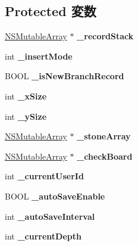 \subsection*{Protected 変数}
\begin{DoxyCompactItemize}
\item 
\hypertarget{interface_games_a7f97e43d2e57ea8b8d24bbebec583013}{
\hyperlink{class_n_s_mutable_array}{NSMutableArray} $\ast$ {\bfseries \_\-recordStack}}
\label{interface_games_a7f97e43d2e57ea8b8d24bbebec583013}

\item 
\hypertarget{interface_games_adf59b1fa9a0cfe911d992ffa2ab00ede}{
int {\bfseries \_\-insertMode}}
\label{interface_games_adf59b1fa9a0cfe911d992ffa2ab00ede}

\item 
\hypertarget{interface_games_af1c274d54923dce41904ba78f1256ac5}{
BOOL {\bfseries \_\-isNewBranchRecord}}
\label{interface_games_af1c274d54923dce41904ba78f1256ac5}

\item 
\hypertarget{interface_games_abb798d37b60e6016079ec2c01335624d}{
int {\bfseries \_\-xSize}}
\label{interface_games_abb798d37b60e6016079ec2c01335624d}

\item 
\hypertarget{interface_games_adbf5d8b47c74df7302f494d2d7e6958f}{
int {\bfseries \_\-ySize}}
\label{interface_games_adbf5d8b47c74df7302f494d2d7e6958f}

\item 
\hypertarget{interface_games_a4a445b26c8840314243be910add4ef81}{
\hyperlink{class_n_s_mutable_array}{NSMutableArray} $\ast$ {\bfseries \_\-stoneArray}}
\label{interface_games_a4a445b26c8840314243be910add4ef81}

\item 
\hypertarget{interface_games_a128844d6d9dbb18844a3ac8b57167329}{
\hyperlink{class_n_s_mutable_array}{NSMutableArray} $\ast$ {\bfseries \_\-checkBoard}}
\label{interface_games_a128844d6d9dbb18844a3ac8b57167329}

\item 
\hypertarget{interface_games_aa473c6742f9bc0192dd115ea3bce6f68}{
int {\bfseries \_\-currentUserId}}
\label{interface_games_aa473c6742f9bc0192dd115ea3bce6f68}

\item 
\hypertarget{interface_games_a946b513550a9d9603bf1c1b75c561845}{
BOOL {\bfseries \_\-autoSaveEnable}}
\label{interface_games_a946b513550a9d9603bf1c1b75c561845}

\item 
\hypertarget{interface_games_acc34d75c0288d85f09e22a6e10d95922}{
int {\bfseries \_\-autoSaveInterval}}
\label{interface_games_acc34d75c0288d85f09e22a6e10d95922}

\item 
\hypertarget{interface_games_a4a67ea08275ead5aa598cf4e2c8ad648}{
int {\bfseries \_\-currentDepth}}
\label{interface_games_a4a67ea08275ead5aa598cf4e2c8ad648}

\end{DoxyCompactItemize}
